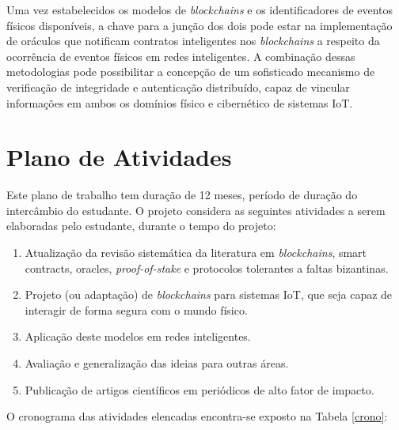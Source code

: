 \documentclass[12pt]{article}
\begin{document}
Uma vez estabelecidos os modelos de \textit{blockchains} e os identificadores de eventos físicos disponíveis, a chave para a junção dos dois pode estar na implementação de oráculos que notificam contratos inteligentes nos \textit{blockchains} a respeito da ocorrência de eventos físicos em redes inteligentes. A combinação dessas metodologias pode possibilitar a concepção de um sofisticado mecanismo de verificação de integridade e autenticação distribuído, capaz de vincular informações em ambos os domínios físico e cibernético de sistemas IoT.

\section{Plano de Atividades}
Este plano de trabalho tem duração de 12 meses, período de duração do intercâmbio do estudante. O projeto considera as seguintes atividades a serem elaboradas pelo estudante, durante o tempo do projeto:

\begin{enumerate}[label=\Alph*]
\item Atualização da revisão sistemática da literatura em \textit{blockchains}, smart contracts, oracles, \textit{proof-of-stake} e protocolos tolerantes a faltas bizantinas.
\item Projeto (ou adaptação) de \textit{blockchains} para sistemas IoT, que seja capaz de interagir de forma segura com o mundo físico.
\item Aplicação deste modelos em redes inteligentes.
\item Avaliação e generalização das ideias para outras áreas.
\item Publicação de artigos científicos em periódicos de alto fator de impacto.
\end{enumerate}

O cronograma das atividades elencadas encontra-se exposto na Tabela \ref{crono}:
\end{document}
